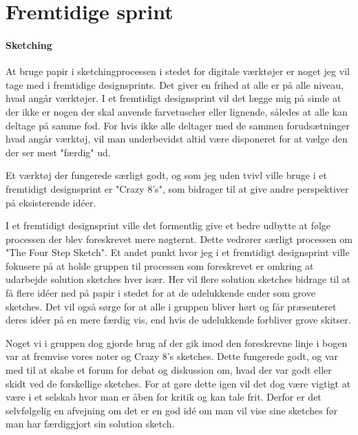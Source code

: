 \documentclass{article}
\begin{document}
\section{Fremtidige sprint}

\paragraph{Sketching} At bruge papir i sketchingprocessen i stedet for digitale
værktøjer er noget jeg vil tage med i fremtidige designsprints. Det giver en
frihed at alle er på alle niveau, hvad angår værktøjer. I et fremtidigt
designsprint vil det lægge mig på sinde at der ikke er nogen der skal anvende
farvetuscher eller lignende, således at alle kan deltage på samme fod. For hvis
ikke alle deltager med de sammen forudsætninger hvad angår værktøj, vil man
underbevidst altid være disponeret for at vælge den der ser mest "færdig" ud.

Et værktøj der fungerede særligt godt, og som jeg uden tvivl ville bruge i et
fremtidigt designsprint er "Crazy 8's", som bidrager til at give andre
perspektiver på eksisterende idéer.

I et fremtidigt designsprint ville det formentlig give et bedre udbytte at følge
processen der blev foreskrevet mere nøgternt. Dette vedrører særligt processen
om "The Four Step Sketch". Et andet punkt hvor jeg i et fremtidigt designsprint
ville fokusere på at holde gruppen til processen som foreskrevet er omkring at
udarbejde solution sketches hver især. Her vil flere solution sketches bidrage
til at få flere idéer ned på papir i stedet for at de udelukkende ender som
grove sketches. Det vil også sørge for at alle i gruppen bliver hørt og får
præsenteret deres idéer på en mere færdig vis, end hvis de udelukkende forbliver
grove skitser.

Noget vi i gruppen dog gjorde brug af der gik imod den foreskrevne linje i bogen
var at fremvise vores noter og Crazy 8's sketches. Dette fungerede godt, og var
med til at skabe et forum for debat og diskussion om, hvad der var godt eller
skidt ved de forskellige sketches.
For at gøre dette igen vil det dog være vigtigt at være i et selskab hvor man
er åben for kritik og kan tale frit. Derfor er det selvfølgelig en afvejning om
det er en god idé om man vil vise sine sketches før man har færdiggjort sin
solution sketch.
\end{document}
